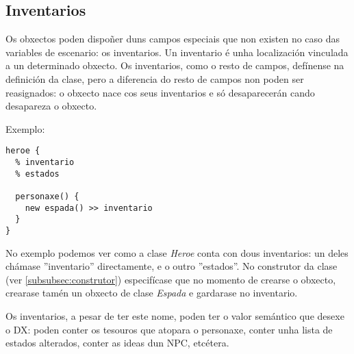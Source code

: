 \subsection{Inventarios}
\label{subsec:inventarios}
Os obxectos poden dispoñer duns campos especiais que non existen no caso das
variables de escenario: os inventarios. Un inventario é unha localización
vinculada a un determinado obxecto. Os inventarios, como o resto de campos,
defínense na definición da clase, pero a diferencia do resto de campos non
poden ser reasignados: o obxecto nace cos seus
inventarios e só desaparecerán cando desapareza o obxecto.
\par Exemplo:
\begin{lstlisting}
heroe {
  % inventario
  % estados
  
  personaxe() {
    new espada() >> inventario
  }
}
\end{lstlisting}
\par
No exemplo podemos ver como a clase {\it Heroe} conta con dous
inventarios: un deles chámase ''inventario'' directamente, e o outro
''estados''. No construtor da clase (ver \ref{subsubsec:construtor})
especifícase que no momento de crearse o obxecto, crearase tamén un obxecto de
clase {\it Espada} e gardarase no inventario.
\par
Os inventarios, a pesar de ter este nome, poden ter o valor semántico que desexe
o DX: poden conter os tesouros que atopara o personaxe, conter unha lista de
estados alterados, conter as ideas dun NPC, etcétera. 